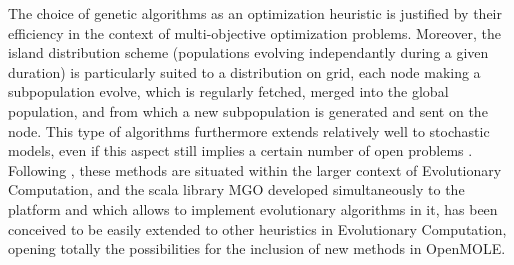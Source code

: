 \documentclass[10pt]{article}
\begin{document}
The choice of genetic algorithms as an optimization heuristic is justified by their efficiency in the context of multi-objective optimization problems. Moreover, the island distribution scheme (populations evolving independantly during a given duration) is particularly suited to a distribution on grid, each node making a subpopulation evolve, which is regularly fetched, merged into the global population, and from which a new subpopulation is generated and sent on the node. This type of algorithms furthermore extends relatively well to stochastic models, even if this aspect still implies a certain number of open problems \citep{}. Following \cite{}, these methods are situated within the larger context of Evolutionary Computation, and the scala library MGO developed simultaneously to the platform and which allows to implement evolutionary algorithms in it, has been conceived to be easily extended to other heuristics in Evolutionary Computation, opening totally the possibilities for the inclusion of new methods in OpenMOLE.
\end{document}
